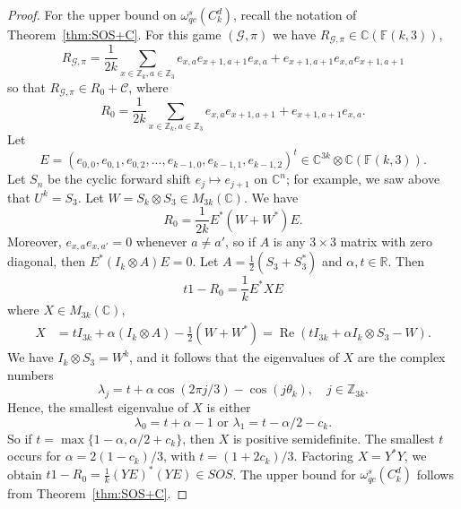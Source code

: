 \documentclass[11pt]{amsart}
\theoremstyle{definition}
\DeclareMathOperator{\re}{Re}
\newcommand{\bb}[1]{\mathbb{#1}}
\newcommand{\cl}[1]{\mathcal{#1}}
\begin{document}
\begin{proof}
  For the upper bound on $\omega_{qc}^s(C_k^d)$, recall the notation of
  Theorem~\ref{thm:SOS+C}. For this game $(\cl G,\pi)$ we have $R_{\cl G,\pi}\in \bb C(\bb F(k,3))$,
  \[ R_{\cl G,\pi}=\frac1{2k}\sum_{x\in \bb Z_k,a\in \bb Z_3} e_{x,a}e_{x+1,a+1}e_{x,a}+e_{x+1,a+1}e_{x,a}e_{x+1,a+1}\]
  so that $R_{\cl G,\pi}\in R_0+\cl C$, where
  \[ R_0=\frac1{2k}\sum_{x\in \bb Z_k,a\in \bb Z_3}e_{x,a}e_{x+1,a+1}+e_{x+1,a+1}e_{x,a}.\]
  Let
  \[E=(e_{0,0}, e_{0,1},e_{0,2},...,e_{k-1,0},e_{k-1,1},e_{k-1,2})^t\in \bb C^{3k}\otimes \bb C(\bb F(k,3)).\]
  Let $S_n$ be the cyclic forward shift $e_j\mapsto e_{j+1}$ on $\bb C^n$; for example, we saw above that $U^k=S_3$. Let $W=S_k\otimes S_3\in M_{3k}(\bb C)$. We have
  \[ R_0= \frac1{2k} E^* (W+W^*) E.\]
  Moreover, $e_{x,a}e_{x,a'}=0$ whenever $a\ne a'$, so if $A$ is any $3\times 3$ matrix with zero diagonal, then $E^*(I_k\otimes A)E=0$. Let
  $A=\frac12(S_3+S_3^*)$
  and $\alpha,t\in \bb R$. Then
  \[ t1-R_0=\frac1k E^*XE\]
  where $X\in M_{3k}(\bb C)$,
  \begin{align*}
    X&=t I_{3k} + \alpha(I_k\otimes A)-\frac12(W+W^*)
    = \re( tI_{3k}+ \alpha I_k\otimes S_3-W).
  \end{align*}
  We have $I_k\otimes S_3=W^k$, and it follows that the eigenvalues of
  $X$ are the complex numbers
  \[ \lambda_j=t+\alpha\cos(2\pi j/3)-\cos(j\theta_k),\quad j\in \bb Z_{3k}.\]
  Hence, the smallest eigenvalue of $X$ is either
  \[ \lambda_0=t+\alpha-1\text{ or }\lambda_1=t-\alpha/2-c_k.\]
  So if $t= \max\{1-\alpha,\alpha/2+c_k\}$, then $X$ is positive semidefinite. The smallest $t$ occurs for $\alpha=2(1-c_k)/3$, with $t=(1+2c_k)/3$. Factoring $X=Y^*Y$, we obtain $t1-R_0=\frac1k(YE)^*(YE)\in SOS$. The upper bound for $\omega_{qc}^s(C_k^d)$ follows from Theorem~\ref{thm:SOS+C}.
\end{proof}
\end{document}
